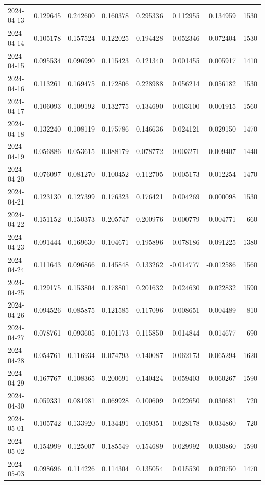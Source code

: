 \begin{tabular}{lrrrrrrr}
2024-04-13 & 0.129645 & 0.242600 & 0.160378 & 0.295336 & 0.112955 & 0.134959 & 1530 \\
2024-04-14 & 0.105178 & 0.157524 & 0.122025 & 0.194428 & 0.052346 & 0.072404 & 1530 \\
2024-04-15 & 0.095534 & 0.096990 & 0.115423 & 0.121340 & 0.001455 & 0.005917 & 1410 \\
2024-04-16 & 0.113261 & 0.169475 & 0.172806 & 0.228988 & 0.056214 & 0.056182 & 1530 \\
2024-04-17 & 0.106093 & 0.109192 & 0.132775 & 0.134690 & 0.003100 & 0.001915 & 1560 \\
2024-04-18 & 0.132240 & 0.108119 & 0.175786 & 0.146636 & -0.024121 & -0.029150 & 1470 \\
2024-04-19 & 0.056886 & 0.053615 & 0.088179 & 0.078772 & -0.003271 & -0.009407 & 1440 \\
2024-04-20 & 0.076097 & 0.081270 & 0.100452 & 0.112705 & 0.005173 & 0.012254 & 1470 \\
2024-04-21 & 0.123130 & 0.127399 & 0.176323 & 0.176421 & 0.004269 & 0.000098 & 1530 \\
2024-04-22 & 0.151152 & 0.150373 & 0.205747 & 0.200976 & -0.000779 & -0.004771 & 660 \\
2024-04-23 & 0.091444 & 0.169630 & 0.104671 & 0.195896 & 0.078186 & 0.091225 & 1380 \\
2024-04-24 & 0.111643 & 0.096866 & 0.145848 & 0.133262 & -0.014777 & -0.012586 & 1560 \\
2024-04-25 & 0.129175 & 0.153804 & 0.178801 & 0.201632 & 0.024630 & 0.022832 & 1590 \\
2024-04-26 & 0.094526 & 0.085875 & 0.121585 & 0.117096 & -0.008651 & -0.004489 & 810 \\
2024-04-27 & 0.078761 & 0.093605 & 0.101173 & 0.115850 & 0.014844 & 0.014677 & 690 \\
2024-04-28 & 0.054761 & 0.116934 & 0.074793 & 0.140087 & 0.062173 & 0.065294 & 1620 \\
2024-04-29 & 0.167767 & 0.108365 & 0.200691 & 0.140424 & -0.059403 & -0.060267 & 1590 \\
2024-04-30 & 0.059331 & 0.081981 & 0.069928 & 0.100609 & 0.022650 & 0.030681 & 720 \\
2024-05-01 & 0.105742 & 0.133920 & 0.134491 & 0.169351 & 0.028178 & 0.034860 & 720 \\
2024-05-02 & 0.154999 & 0.125007 & 0.185549 & 0.154689 & -0.029992 & -0.030860 & 1590 \\
2024-05-03 & 0.098696 & 0.114226 & 0.114304 & 0.135054 & 0.015530 & 0.020750 & 1470 \\

\end{tabular}
